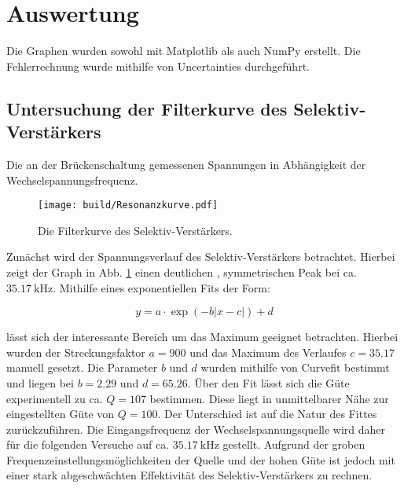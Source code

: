 \section{Auswertung}
\label{sec:Auswertung}

Die Graphen wurden sowohl mit Matplotlib \cite{matplotlib} als auch NumPy \cite{numpy} erstellt. Die
 Fehlerrechnung wurde mithilfe von Uncertainties \cite{uncertainties} durchgeführt.

\subsection{Untersuchung der Filterkurve des Selektiv-Verstärkers}

\begin{table}
 \centering
 \caption{Die an der Brückenschaltung gemessenen Spannungen in Abhängigkeit der Wechselspannungsfrequenz.}
 
 
\end{table}


\begin{figure}
 \centering
 \caption{Die Filterkurve des Selektiv-Verstärkers.}
 \texttt{[image: build/Resonanzkurve.pdf]}
 \label{fig:GraphSelektiv}
\end{figure}

Zunächst wird der Spannungsverlauf des Selektiv-Verstärkers betrachtet. Hierbei
zeigt der Graph in Abb. \ref{fig:GraphSelektiv} einen deutlichen , symmetrischen
Peak bei ca. $\SI{35.17}{\kilo\hertz}$. Mithilfe eines exponentiellen Fits der Form:

\begin{equation}
  y = a \cdot \exp(-b|x-c|)+d
  \end{equation}

lässt sich der interessante Bereich um das Maximum geeignet betrachten. Hierbei
wurden der Streckungsfaktor $a = 900$ und das Maximum des Verlaufes $c = 35.17$ manuell gesetzt. Die Parameter $b$
und $d$ wurden mithilfe von Curvefit bestimmt und liegen bei $b = 2.29$ und $d = 65.26$.
Über den Fit lässt sich die Güte experimentell zu ca. $Q = 107$ bestimmen. Diese
liegt in unmittelbarer Nähe zur eingestellten Güte von $Q = 100$. Der Unterschied
ist auf die Natur des Fittes zurückzuführen. Die Eingangsfrequenz der
Wechselspannungsquelle wird daher für die folgenden Versuche auf ca. $\SI{35.17}{\kilo\hertz}$
gestellt. Aufgrund der groben Frequenzeinstellungsmöglichkeiten der Quelle und der hohen Güte
ist jedoch mit einer stark abgeschwächten Effektivität des Selektiv-Verstärkers zu rechnen.
